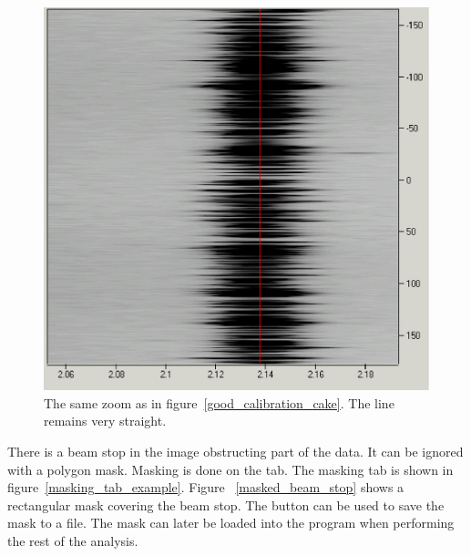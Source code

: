 \begin{figure}
    \centering
    \includegraphics[scale=.75]
    {figures/good_calibration_cake_zoom.eps}
    \caption{The same zoom as in figure~\ref{good_calibration_cake}. 
    The line remains very straight.}
    \label{good_calibration_cake_zoom}
\end{figure}

There is a beam stop in the image obstructing part of the data. 
It can be ignored with a polygon mask. Masking is done
on the  tab. The masking tab is shown in 
figure~\ref{masking_tab_example}. Figure 
~\ref{masked_beam_stop} shows a rectangular mask covering
the beam stop.
The  button can be used to save the mask
to a file. The mask can later be loaded into the program when
performing the rest of the analysis.

